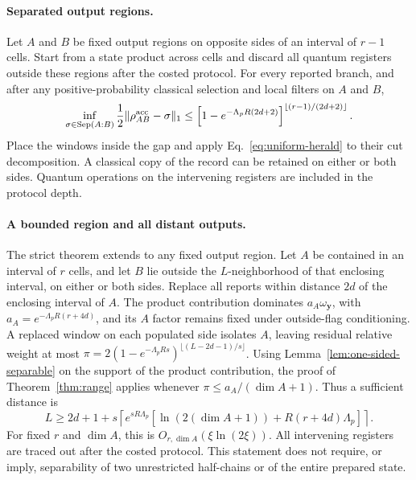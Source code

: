 \documentclass[aps,prl,twocolumn,superscriptaddress,longbibliography,reprint,floatfix]{revtex4-2}
\begin{document}
\paragraph*{Separated output regions.}
Let $A$ and $B$ be fixed output regions on opposite sides of an interval
of $r-1$ cells. Start from a state product across cells and discard all
quantum registers outside these regions after the costed protocol.
For every reported branch, and after any positive-probability classical
selection and local filters on $A$ and $B$,
\begin{equation}
 \inf_{\sigma\in\operatorname{Sep}(A:B)}
 \frac12\|\rho_{AB}^{\rm acc}-\sigma\|_1
 \le
 \left[1-e^{-\Lambda_p R(2d+2)}\right]^{{\lfloor
 (r-1)/(2d+2)\rfloor}}.
 \label{eq:separated-regions}
\end{equation}
Place the windows inside the gap and apply Eq.~\eqref{eq:uniform-herald}
to their cut decomposition. A classical copy of the record can be
retained on either or both sides. Quantum operations on the intervening
registers are included in the protocol depth.

\paragraph*{A bounded region and all distant outputs.}
The strict theorem extends to any fixed output region. Let $A$ be
contained in an interval of $r$ cells,
and let $B$ lie outside the $L$-neighborhood of that enclosing interval,
on either or both sides.
Replace all reports within distance $2d$ of the enclosing interval of
$A$. The product contribution dominates
$a_A\omega_{\boldsymbol y}$, with $a_A=e^{-\Lambda_p R(r+4d)}$, and its $A$ factor
remains fixed under outside-flag conditioning. A replaced window on each populated side isolates $A$, leaving
residual relative weight at most $\pi=2(1-e^{-\Lambda_p Rs})^{\lfloor(L-2d-1)/s\rfloor}$.
Using Lemma~\ref{lem:one-sided-separable} on the support of the product contribution, the proof of Theorem~\ref{thm:range} applies whenever
$\pi\le a_A/(\dim A+1)$. Thus a sufficient distance is
\begin{equation}
 L\ge 2d+1+s\left\lceil e^{sR\Lambda_p}
 \left[\ln(2(\dim A+1))+R(r+4d)\Lambda_p\right]\right\rceil.
 \label{eq:bounded-region-range}
\end{equation}
For fixed $r$ and $\dim A$, this is $O_{r,\dim A}(\xi\ln(2\xi))$.
All intervening registers are traced out after the costed protocol.
This statement does not require, or imply, separability of two
unrestricted half-chains or of the entire prepared state.
\end{document}
